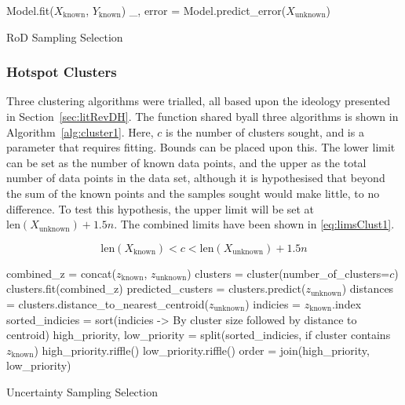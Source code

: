 \begin{algorithm}[H]
  Model.fit($X_\mathrm{known}$, $Y_\mathrm{known}$)\;
  \_, error = Model.predict\_error($X_\mathrm{unknown}$)\;
  \caption{RoD Sampling Selection}
  \label{alg:rod}\SetAlgoLined
\end{algorithm}

\subsubsection{Hotspot Clusters}
Three clustering algorithms were trialled, all based upon the ideology presented in Section~\ref{sec:litRevDH}. The function shared byall three algorithms is shown in Algorithm~\ref{alg:cluster1}. Here, $c$ is the number of clusters sought, and is a parameter that requires fitting. Bounds can be placed upon this. The lower limit can be set as the number of known data points, and the upper as the total number of data points in the data set, although it is hypothesised that beyond the sum of the known points and the samples sought would make little, to no difference. To test this hypothesis, the upper limit will be set at $\mathrm{len}(X_\mathrm{unknown})+1.5n$. The combined limits have been shown in \ref{eq:limsClust1}.

\begin{equation}
  \label{eq:limsClust1}
  {\mathrm{len}(X_\mathrm{known})<c<\mathrm{len}(X_\mathrm{unknown})+1.5n}
\end{equation}

\begin{algorithm}[H]
  combined\_z = concat($z_\mathrm{known}$, $z_\mathrm{unknown}$)\;
  clusters = cluster(number\_of\_clusters=$c$)\;
  clusters.fit(combined\_z)\;
  predicted\_custers = clusters.predict($z_\mathrm{unknown}$)\;
  distances = clusters.distance\_to\_nearest\_centroid($z_\mathrm{unknown}$)\;
  indicies = $z_\mathrm{known}$.index\;
  sorted\_indicies = sort(indicies -> By cluster size followed by distance to centroid) \;
  high\_priority, low\_priority = split(sorted\_indicies, if cluster contains $z_\mathrm{known}$)\;
  high\_priority.riffle()\;
  low\_priority.riffle()\;
  order = join(high\_priority, low\_priority)\;

  \caption{Uncertainty Sampling Selection}
  \label{alg:cluster1}\SetAlgoLined
\end{algorithm}

